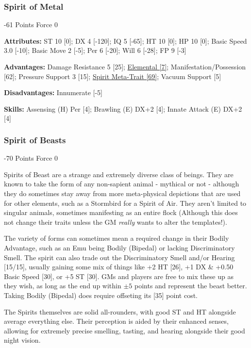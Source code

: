 \begin{multicols}{3}
	\subsubsection*{Spirit of Metal}
	\begin{flushright}
		-61 Points Force 0
	\end{flushright}

	\textbf{Attributes:}
	ST 10 [0]; DX 4 [-120]; IQ 5 [-65]; HT 10 [0]; HP 10 [0]; Basic Speed 3.0 [-10]; Basic Move 2 [-5]; Per 6 [-20]; Will 6 [-28]; FP 9 [-3]
	
	\textbf{Advantages:}
	Damage Resistance 5 [25]; \hyperref[elemental]{Elemental [7]}; Manifestation/Possession [62]; Pressure Support 3 [15]; \hyperref[spirit_meta_trait]{Spirit Meta-Trait [69]}; Vacuum Support [5]
	
	\textbf{Disadvantages:}
	Innumerate [-5]
	
	\textbf{Skills:}
	Assensing (H) Per [4]; Brawling (E) DX+2 [4]; Innate Attack (E) DX+2 [4]

	
	\subsubsection{Spirit of Beasts}
	\begin{flushright}
		-70 Points Force 0
	\end{flushright}
	
	Spirits of Beast are a strange and extremely diverse class of beings. They are known to take the form of any non-sapient animal - mythical or not - although they do sometimes stay away from more meta-physical depictions that are used for other elements, such as a Stormbird for a Spirit of Air. They aren't limited to singular animals, sometimes manifesting as an entire flock (Although this does not change their traits unless the GM \textit{really }wants to alter the templates!).
	
	The variety of forms can sometimes mean a required change in their Bodily Advantage, such as an Emu being Bodily (Bipedal) or lacking Discriminatory Smell. The spirit can also trade out the Discriminatory Smell and/or Hearing [15/15], usually gaining some mix of things like +2 HT [26], +1 DX \& +0.50 Basic Speed [30], or +5 ST [30]. GMs and players are free to mix these up as they wish, as long as the end up within \(\pm5\) points and represent the beast better. Taking Bodily (Bipedal) does require offseting its [35] point cost.
	
	The Spirits themselves are solid all-rounders, with good ST and HT alongside average everything else. Their perception is aided by their enhanced senses, allowing for extremely precise smelling, tasting, and hearing alongside their good night vision.
	

\end{multicols}
